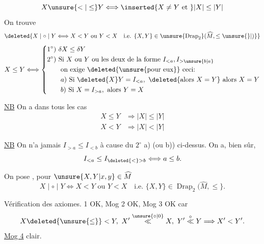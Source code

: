 \[
X\unsure{<|\leq}Y\Longleftrightarrow\inserted{X\ne Y\text{ et }}|X|\leq|Y|
\]
On trouve
\[
\deleted{X\mid\circ\mid Y\Longleftrightarrow X<Y\text{ ou }Y<X\quad\text{i.e. }\{X,Y\}\in\unsure{\operatorname{Drap}_2}(\widehat M,\leq\unsure{\}|)}}
\]
\[
X\leq Y\Longleftrightarrow
\left\{\begin{aligned}
&1^\circ)\ \delta X\leq\delta Y\\
&2^\circ)\ \text{Si }X\text{ ou }Y\text{ ou les deux de la forme }I_{<a},I_{>\unsure{b|a}}\\
&\qquad\text{on exige }\deleted{\text{\unsure{pour eux}}}\text{ ceci:}\\
&\qquad a)\ \text{Si }\deleted{X}Y=I_{<a},\ \deleted{\text{alors }X=Y}\text{ alors }X=Y\\
&\qquad b)\ \text{Si }X=I_{>a},\ \text{alors }Y=X
\end{aligned}\right.
\]

\uline{NB} On a dans tous les cas
\[
\begin{aligned}
X\leq Y&\Longrightarrow |X|\leq|Y|\\
X<Y&\Longrightarrow |X|<|Y|
\end{aligned}
\]

\uline{NB} On n'a jamais $I_{>a}\leq I_{<b}$ à cause du $2^\circ$ a) (ou b)) ci-dessus. On a, bien sûr,
\[
I_{<a}\leq I_{\deleted{<}>b}\Longleftrightarrow a\leq b.
\]

On pose \deleted{$\unsure{\varphi|\phi}$}, pour $\unsure{X,Y|x,y}\in\widehat M$
\[
X\mid\circ\mid Y\Longleftrightarrow X<Y\text{ ou }Y<X\quad\text{i.e. }\{X,Y\}\in\operatorname{Drap}_2(\widehat M,\leq\}.
\]

Vérification des axiomes.  1 OK, Mog 2 OK, Mog 3 OK car
\[
X\deleted{\unsure{\leq}}<Y,\ X'\overset{\unsure{\circ|0}}{\ll}X,\ Y'\overset{\circ}{\ll}Y\Longrightarrow X'<Y'.
\]
\uline{Mog 4} clair.
